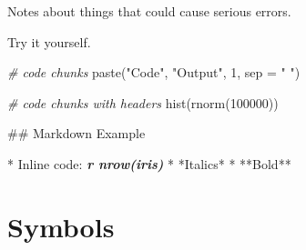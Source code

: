 \documentclass[
  oneside]{book}
\newenvironment{Shaded}{\begin{snugshade}}{\end{snugshade}}
\newcommand{\AttributeTok}[1]{\textcolor[rgb]{0.77,0.63,0.00}{#1}}
\newcommand{\CommentTok}[1]{\textcolor[rgb]{0.56,0.35,0.01}{\textit{#1}}}
\newcommand{\DecValTok}[1]{\textcolor[rgb]{0.00,0.00,0.81}{#1}}
\newcommand{\FunctionTok}[1]{\textcolor[rgb]{0.00,0.00,0.00}{#1}}
\newcommand{\InformationTok}[1]{\textcolor[rgb]{0.56,0.35,0.01}{\textbf{\textit{#1}}}}
\newcommand{\NormalTok}[1]{#1}
\newcommand{\SpecialStringTok}[1]{\textcolor[rgb]{0.31,0.60,0.02}{#1}}
\newcommand{\StringTok}[1]{\textcolor[rgb]{0.31,0.60,0.02}{#1}}
\begin{document}
\begin{dangerous}
Notes about things that could cause serious errors.

\end{dangerous}

\begin{try}
Try it yourself.

\end{try}

\begin{Shaded}
\begin{Highlighting}[]
\CommentTok{\# code chunks}
\FunctionTok{paste}\NormalTok{(}\StringTok{"Code"}\NormalTok{, }\StringTok{"Output"}\NormalTok{, }\DecValTok{1}\NormalTok{, }\AttributeTok{sep =} \StringTok{" "}\NormalTok{)}
\end{Highlighting}
\end{Shaded}

\begin{Shaded}
\begin{Highlighting}[]
\CommentTok{\# code chunks with headers}
\FunctionTok{hist}\NormalTok{(}\FunctionTok{rnorm}\NormalTok{(}\DecValTok{100000}\NormalTok{))}
\end{Highlighting}
\end{Shaded}

\begin{Shaded}
\begin{Highlighting}[]
\FunctionTok{\#\# Markdown Example}

\SpecialStringTok{* }\NormalTok{Inline code: }\InformationTok{\textasciigrave{}r nrow(iris)\textasciigrave{}}
\SpecialStringTok{* }\NormalTok{*Italics*}
\SpecialStringTok{* }\NormalTok{**Bold**}
\end{Highlighting}
\end{Shaded}

\hypertarget{symbols}{%
\chapter{Symbols}\label{symbols}}
\end{document}
